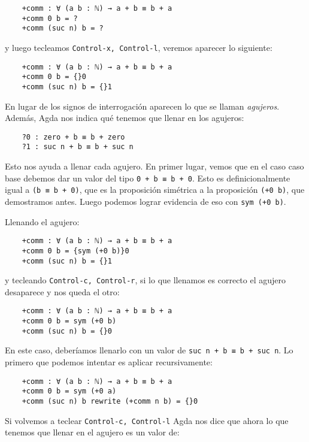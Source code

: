 \documentclass[11pt]{article} %
\begin{document}
\begin{verbatim}
    +comm : ∀ (a b : ℕ) → a + b ≡ b + a
    +comm 0 b = ?
    +comm (suc n) b = ?    
\end{verbatim}

y luego tecleamos \verb|Control-x, Control-l|, veremos aparecer lo siguiente:

\begin{verbatim}
    +comm : ∀ (a b : ℕ) → a + b ≡ b + a
    +comm 0 b = {}0
    +comm (suc n) b = {}1    
\end{verbatim}

En lugar de los signos de interrogación aparecen lo que se llaman \textit{agujeros}. Además, Agda nos indica qué tenemos que llenar en los agujeros:

\begin{verbatim}
    ?0 : zero + b ≡ b + zero
    ?1 : suc n + b ≡ b + suc n        
\end{verbatim}

Esto nos ayuda a llenar cada agujero. En primer lugar, vemos que en el caso caso base debemos dar un valor del tipo \verb|0 + b ≡ b + 0|. Esto  es definicionalmente igual a \verb|(b ≡ b + 0)|, que es la proposición simétrica a la proposición \verb|(+0 b)|, que demostramos antes. Luego podemos lograr evidencia de eso con \verb|sym (+0 b)|. 

Llenando el agujero:

\begin{verbatim}
    +comm : ∀ (a b : ℕ) → a + b ≡ b + a
    +comm 0 b = {sym (+0 b)}0
    +comm (suc n) b = {}1
\end{verbatim}

y tecleando \verb|Control-c, Control-r|, si lo que llenamos es correcto el agujero desaparece y nos queda el otro: 

\begin{verbatim}
    +comm : ∀ (a b : ℕ) → a + b ≡ b + a
    +comm 0 b = sym (+0 b)
    +comm (suc n) b = {}0
\end{verbatim}

En este caso, deberíamos llenarlo con un valor de \verb|suc n + b ≡ b + suc n|. Lo primero que podemos intentar es aplicar recursivamente:

\begin{verbatim}
    +comm : ∀ (a b : ℕ) → a + b ≡ b + a
    +comm 0 b = sym (+0 a)
    +comm (suc n) b rewrite (+comm n b) = {}0
\end{verbatim}

Si volvemos a teclear \verb|Control-c, Control-l| Agda nos dice que ahora lo que tenemos que llenar en el agujero es un valor de:
\end{document}
